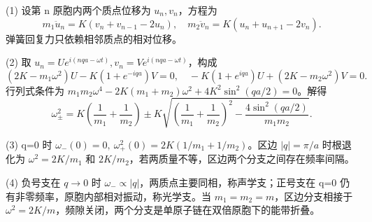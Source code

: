 (1) 设第 n 原胞内两个质点位移为 \(u_n,v_n\)，方程为
\[
m_1\ddot u_n=K(v_n+v_{n-1}-2u_n),\quad
m_2\ddot v_n=K(u_n+u_{n+1}-2v_n).
\]
弹簧回复力只依赖相邻质点的相对位移。

(2) 取 \(u_n=Ue^{i(nqa-\omega t)},v_n=Ve^{i(nqa-\omega t)}\)，构成
\[
(2K-m_1\omega^2)U-K(1+e^{-iqa})V=0,\quad
-K(1+e^{iqa})U+(2K-m_2\omega^2)V=0.
\]
行列式条件为 \(m_1m_2\omega^4-2K(m_1+m_2)\omega^2+4K^2\sin^2(qa/2)=0\)。解得
\[
\omega_\pm^2=K\left(\frac1{m_1}+\frac1{m_2}\right)
\pm K\sqrt{\left(\frac1{m_1}+\frac1{m_2}\right)^2-\frac{4\sin^2(qa/2)}{m_1m_2}}.
\]

(3) q=0 时 \(\omega_-(0)=0,\ \omega_+^2(0)=2K(1/m_1+1/m_2)\)。区边 \(|q|=\pi/a\) 时根退化为 \(\omega^2=2K/m_1\) 和 \(2K/m_2\)，若两质量不等，区边两个分支之间存在频率间隔。

(4) 负号支在 \(q\to 0\) 时 \(\omega_-\propto|q|\)，两质点主要同相，称声学支；正号支在 q=0 仍有非零频率，原胞内部相对振动，称光学支。当 \(m_1=m_2=m\)，区边分支相接于 \(\omega^2=2K/m\)，频隙关闭，两个分支是单原子链在双倍原胞下的能带折叠。

